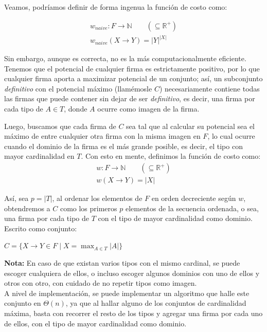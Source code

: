\documentclass[letterpaper, 12pt]{article}
\begin{document}
\begin{enumerate}
\begin{enumerate}
    Veamos, podríamos definir de forma ingenua la función de costo como:
    \begin{center}
        \begin{align*}
            w_{naive}: F \rightarrow \mathbb{N} \qquad (\subseteq \mathbb{R}^+) \\
            w_{naive}(X \rightarrow Y) = |Y|^{|X|}
        \end{align*}
    \end{center}

    Sin embargo, aunque es correcta, no es la más computacionalmente eficiente. Tenemos que el potencial de cualquier firma es estrictamente positivo, por lo que cualquier firma aporta a maximizar potencial de un conjunto; así, un subconjunto \emph{definitivo} con el potencial máximo (llamémosle $C$) necesariamente contiene todas las firmas que puede contener sin dejar de ser \emph{definitivo}, es decir, una firma por cada tipo de $A \in T$, donde $A$ ocurre como imagen de la firma.

    Luego, buscamos que cada firma de $C$ sea tal que al calcular su potencial sea el máximo de entre cualquier otra firma con la misma imagen en $F$, lo cual ocurre cuando el dominio de la firma es el más grande posible, es decir, el tipo con mayor cardinalidad en $T$. Con esto en mente, definimos la función de costo como:
    \begin{align*}
        w: F \rightarrow \mathbb{N} \qquad (\subseteq \mathbb{R}^+) \\
        w(X \rightarrow Y) = |X|
    \end{align*}

    Así, sea $p = |T|$, al ordenar los elementos de $F$ en orden decreciente según $w$, obtendremos a $C$ como los primeros $p$ elementos de la secuencia ordenada, o sea, una firma por cada tipo de $T$ con el tipo de mayor cardinalidad como dominio. Escrito como conjunto: \\

    \begin{center}
        $C = \{X \rightarrow Y \in F \mid X = \max_{A \in T} |A|\}$
    \end{center}

    \textbf{Nota:} En caso de que existan varios tipos con el mismo cardinal, se puede escoger cualquiera de ellos, o incluso escoger algunos dominios con uno de ellos y otros con otro, con cuidado de no repetir tipos como imagen. \\

    A nivel de implementación, se puede implementar un algoritmo que halle este conjunto en $\Theta(n)$, ya que al hallar alguno de los conjuntos de cardinalidad máxima, basta con recorrer el resto de los tipos y agregar una firma por cada uno de ellos, con el tipo de mayor cardinalidad como dominio. \\

\end{enumerate}

\end{enumerate} \vspace{4mm}
\end{document}

